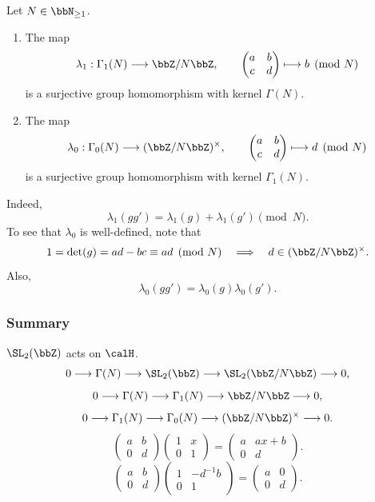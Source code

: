 \begin{proposition}\label{Prop:MF_congruence_quotients}
    Let $N \in \bbN_{\ge 1}$.
    \begin{enumerate}[label=\arabic*)]
        \item The map
        \[
            \lambda_1 : \Gamma_1(N) \longrightarrow \bbZ/N\bbZ,
            \qquad\begin{pmatrix}a & b\\ c & d\end{pmatrix} \longmapsto b\pmod N
        \]
        is a surjective group homomorphism with kernel $\Gamma(N)$.
        \item The map
        \[
            \lambda_0 : \Gamma_0(N) \longrightarrow (\bbZ/N\bbZ)^\times,
            \qquad\begin{pmatrix}a & b\\ c & d\end{pmatrix} \longmapsto d\pmod N
        \]
        is a surjective group homomorphism with kernel $\Gamma_1(N)$.
    \end{enumerate}
\end{proposition}
\noindent Indeed,
\[
    \lambda_1(gg') = \lambda_1(g) + \lambda_1(g')\pmod N.
\]
To see that $\lambda_0$ is well-defined, note that
\[
    1 = \det(g) = ad - bc \equiv ad\pmod N
    \quad \Longrightarrow \quad d \in (\bbZ/N\bbZ)^\times.
\]
Also,
\[
    \lambda_0(gg') = \lambda_0(g)\lambda_0(g').
\]

\subsubsection*{Summary} $\SL_2(\bbZ)$ acts on $\calH$.
\[
    0 \longrightarrow \Gamma(N) \longrightarrow \SL_2(\bbZ)
    \longrightarrow \SL_2(\bbZ/N\bbZ) \longrightarrow 0,
\]
\[
    0 \longrightarrow \Gamma(N) \longrightarrow \Gamma_1(N)
    \longrightarrow \bbZ/N\bbZ \longrightarrow 0,
\]
\[
    0 \longrightarrow \Gamma_1(N) \longrightarrow \Gamma_0(N)
    \longrightarrow (\bbZ/N\bbZ)^\times\longrightarrow 0.
\]
\[
    \begin{pmatrix}a & b\\ 0 & d\end{pmatrix}
    \begin{pmatrix}1 & x\\ 0 & 1\end{pmatrix}
    = \begin{pmatrix}a & ax + b\\ 0 & d\end{pmatrix}.
\]
\[
    \begin{pmatrix}a & b\\ 0 & d\end{pmatrix}
    \begin{pmatrix}1 & -d^{-1}b\\ 0 & 1\end{pmatrix}
    = \begin{pmatrix}a & 0\\ 0 & d\end{pmatrix}.
\]

